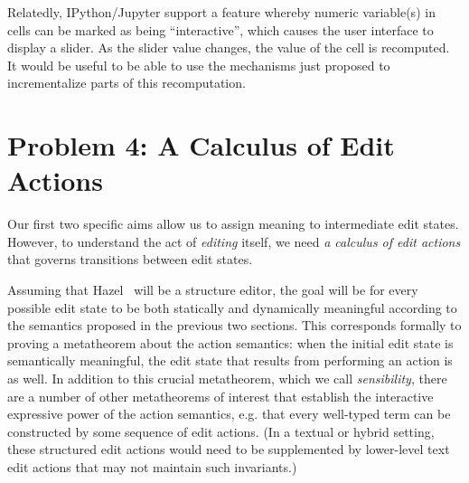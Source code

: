 \documentclass[letterpaper,USenglish]{lipics-v2016}
\newcommand{\Hazel}[0]{\textsf{Hazel}}
\newcommand{\HazelEnv}[0]{\Hazel}
\begin{document}
Relatedly, IPython/Jupyter \cite{Perez:2007:ISI:1251563.1251831} support a feature whereby numeric variable(s) in cells can be marked as being ``interactive'', which causes the user interface to display a slider. As the slider value changes, the value of the cell is recomputed. It would be useful to be able to use the mechanisms just proposed to incrementalize parts of this recomputation.






       \section{Problem 4: A Calculus of Edit Actions} Our first two specific aims
allow us to assign meaning to intermediate edit states. However, to
understand the act of \emph{editing} itself, we need \emph{a calculus of edit actions} that governs transitions between edit
states. 

Assuming that \HazelEnv~ will be a structure editor, the goal will be for every possible edit state to be both statically and
dynamically meaningful according to the semantics proposed in the previous two
sections. This corresponds formally to proving a
metatheorem about the action semantics: when the initial edit state is
semantically meaningful, the edit state that results from performing an action
is as well. In addition to this crucial metatheorem, which
we call \emph{sensibility}, there are a number of other metatheorems of interest
that establish the interactive expressive power of the action semantics, e.g. that every well-typed term can be constructed by some sequence of edit actions. 
(In a textual or hybrid setting, these structured edit actions would need to be supplemented by lower-level text edit actions that may not maintain such invariants.)
\end{document}
